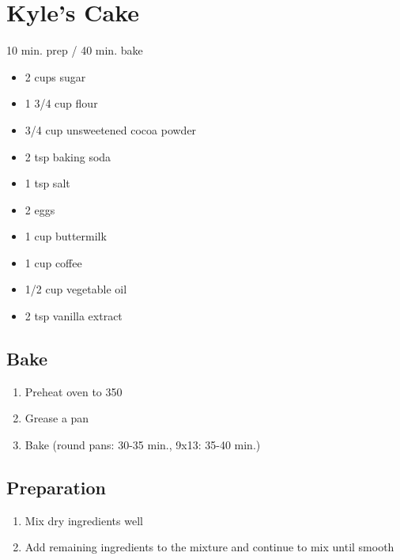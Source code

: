 \documentclass{article}
\begin{document}
\section{Kyle's Cake}

10 min. prep / 40 min. bake

\begin{itemize}
\item 2 cups sugar
\item 1 3/4 cup flour
\item 3/4 cup unsweetened cocoa powder
\item 2 tsp baking soda
\item 1 tsp salt
\item 2 eggs
\item 1 cup buttermilk
\item 1 cup coffee
\item 1/2 cup vegetable oil
\item 2 tsp vanilla extract
\end{itemize}

\subsection{Bake}

\begin{enumerate}
\item Preheat oven to 350
\item Grease a pan
\item Bake (round pans: 30-35 min., 9x13: 35-40 min.)
\end{enumerate}

\subsection{Preparation}

\begin{enumerate}
\item Mix dry ingredients well
\item Add remaining ingredients to the mixture and continue to mix until smooth
\end{enumerate}
\end{document}
